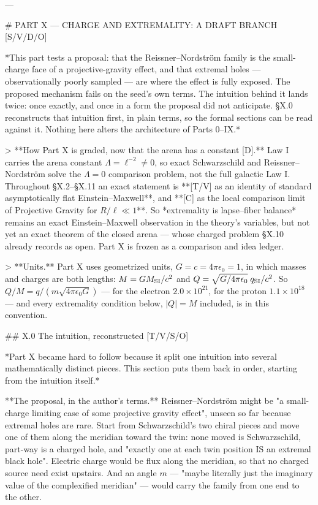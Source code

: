 ---

# PART X — CHARGE AND EXTREMALITY: A DRAFT BRANCH [S/V/D/O]

*This part tests a proposal: that the Reissner–Nordström family is the small-charge face of a projective-gravity effect, and that extremal holes — observationally poorly sampled — are where the effect is fully exposed. The proposed mechanism fails on the seed's own terms. The intuition behind it lands twice: once exactly, and once in a form the proposal did not anticipate. §X.0 reconstructs that intuition first, in plain terms, so the formal sections can be read against it. Nothing here alters the architecture of Parts 0–IX.*


> **How Part X is graded, now that the arena has a constant [D].** Law I carries the arena constant $\Lambda = \ell^{-2}\neq0$, so exact Schwarzschild and Reissner–Nordström solve the $\Lambda = 0$ comparison problem, not the full galactic Law I. Throughout §X.2–§X.11 an exact statement is **[T/V] as an identity of standard asymptotically flat Einstein–Maxwell**, and **[C] as the local comparison limit of Projective Gravity for $R/\ell\ll1$**. So *extremality is lapse–fiber balance* remains an exact Einstein–Maxwell observation in the theory's variables, but not yet an exact theorem of the closed arena — whose charged problem §X.10 already records as open. Part X is frozen as a comparison and idea ledger.

> **Units.** Part X uses geometrized units, $G = c = 4\pi\epsilon_0 = 1$, in which masses and charges are both lengths: $M = GM_{\rm SI}/c^2$ and $Q = \sqrt{G/4\pi\epsilon_0}\;q_{\rm SI}/c^2$. So $Q/M = q/(m\sqrt{4\pi\epsilon_0G})$ — for the electron $2.0\times10^{21}$, for the proton $1.1\times10^{18}$ — and every extremality condition below, $|Q| = M$ included, is in this convention.

## X.0 The intuition, reconstructed [T/V/S/O]

*Part X became hard to follow because it split one intuition into several mathematically distinct pieces. This section puts them back in order, starting from the intuition itself.*

**The proposal, in the author's terms.** Reissner–Nordström might be "a small-charge limiting case of some projective gravity effect", unseen so far because extremal holes are rare. Start from Schwarzschild's two chiral pieces and move one of them along the meridian toward the twin: none moved is Schwarzschild, part-way is a charged hole, and "exactly one at each twin position IS an extremal black hole". Electric charge would be flux along the meridian, so that no charged source need exist upstairs. And an angle $m$ — "maybe literally just the imaginary value of the complexified meridian" — would carry the family from one end to the other.

